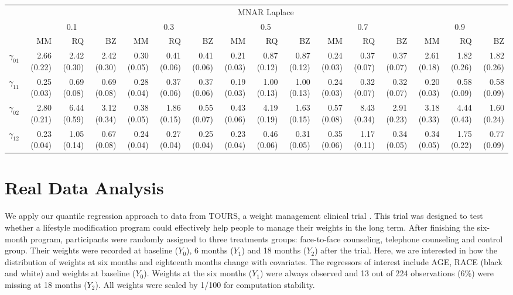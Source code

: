 \documentclass[12pt]{article}
\begin{document}
\begin{landscape}
\begin{table}[h]
  \begin{tabular}{rrrrrrrrrrrrrrrr}
    \toprule
    & \multicolumn{15}{c}{MNAR Laplace} \\
    \cline{2-16}
    &  \multicolumn{3}{c}{0.1} &  \multicolumn{3}{c}{0.3} &  \multicolumn{3}{c}{0.5} &
    \multicolumn{3}{c}{0.7} &  \multicolumn{3}{c}{0.9} \\
    \cline{2-16}
    & MM   & RQ   & BZ   & MM   & RQ   & BZ   & MM   & RQ   & BZ   & MM   & RQ   & BZ   & MM   & RQ   & BZ   \\
    \hline
    $\gamma_{01}$ &2.66 (0.22) & 2.42 (0.30) & 2.42 (0.30) & 0.30 (0.05) & 0.41 (0.06) & 0.41 (0.06) & 0.21 (0.03) & 0.87 (0.12) & 0.87 (0.12) & 0.24 (0.03) & 0.37 (0.07) & 0.37 (0.07) & 2.61 (0.18) & 1.82 (0.26) & 1.82 (0.26) \\
    $\gamma_{11}$ &0.25 (0.03) & 0.69 (0.08) & 0.69 (0.08) & 0.28 (0.04) & 0.37 (0.06) & 0.37 (0.06) & 0.19 (0.03) & 1.00 (0.13) & 1.00 (0.13) & 0.24 (0.03) & 0.32 (0.07) & 0.32 (0.07) & 0.20 (0.03) & 0.58 (0.09) & 0.58 (0.09) \\
    $\gamma_{02}$ &2.80 (0.21) & 6.44 (0.59) & 3.12 (0.34) & 0.38 (0.05) & 1.86 (0.15) & 0.55 (0.07) & 0.43 (0.06) & 4.19 (0.19) & 1.63 (0.15) & 0.57 (0.08) & 8.43 (0.34) & 2.91 (0.23) & 3.18 (0.33) & 4.44 (0.43) & 1.60 (0.24) \\
    $\gamma_{12}$ &0.23 (0.04) & 1.05 (0.14) & 0.67 (0.08) & 0.24 (0.04) & 0.27 (0.04) & 0.25 (0.04) & 0.23 (0.04) & 0.46 (0.06) & 0.31 (0.05) & 0.35 (0.06) & 1.17 (0.11) & 0.34 (0.05) & 0.34 (0.05) & 1.75 (0.22) & 0.77 (0.09) \\
    \bottomrule
  \end{tabular}

\end{table}
\end{landscape}

\section{Real Data Analysis}
\label{sec:real}
We apply our quantile regression approach to data from TOURS, a weight
management clinical trial \citep{perri2008extended}.  This trial was
designed to test whether a lifestyle modification program could
effectively help people to manage their weights in the long
term. After finishing the six-month program, participants were
randomly assigned to three treatments groups: face-to-face counseling,
telephone counseling and control group. Their weights were recorded at
baseline ($Y_0$), 6 months ($Y_1$) and 18 months ($Y_2$) after the
trial. Here, we are interested in how the distribution of weights at
six months and eighteenth months change with covariates. The
regressors of interest include AGE, RACE (black and white) and weights
at baseline ($Y_0$). Weights at the six months ($Y_1$) were always
observed and 13 out of 224 observations (6\%) were missing at 18
months ($Y_2$). All weights were scaled by 1/100 for computation
stability.
\end{document}
